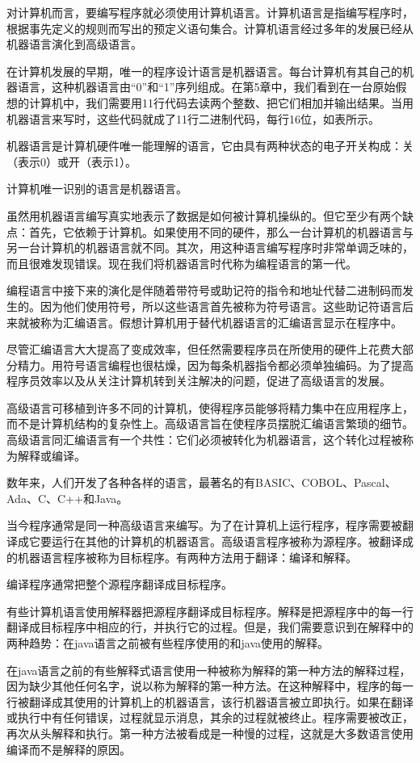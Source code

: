 
对计算机而言，要编写程序就必须使用计算机语言。计算机语言是指编写程序时，根据事先定义的规则而写出的预定义语句集合。计算机语言经过多年的发展已经从机器语言演化到高级语言。

在计算机发展的早期，唯一的程序设计语言是机器语言。每台计算机有其自己的机器语言，这种机器语言由“0”和“1”序列组成。在第5章中，我们看到在一台原始假想的计算机中，我们需要用11行代码去读两个整数、把它们相加并输出结果。当用机器语言来写时，这些代码就成了11行二进制代码，每行16位，如表所示。

机器语言是计算机硬件唯一能理解的语言，它由具有两种状态的电子开关构成：关（表示0）或开（表示1）。

计算机唯一识别的语言是机器语言。

虽然用机器语言编写真实地表示了数据是如何被计算机操纵的。但它至少有两个缺点：首先，它依赖于计算机。如果使用不同的硬件，那么一台计算机的机器语言与另一台计算机的机器语言就不同。其次，用这种语言编写程序时非常单调乏味的，而且很难发现错误。现在我们将机器语言时代称为编程语言的第一代。

编程语言中接下来的演化是伴随着带符号或助记符的指令和地址代替二进制码而发生的。因为他们使用符号，所以这些语言首先被称为符号语言。这些助记符语言后来就被称为汇编语言。假想计算机用于替代机器语言的汇编语言显示在程序中。

尽管汇编语言大大提高了变成效率，但任然需要程序员在所使用的硬件上花费大部分精力。用符号语言编程也很枯燥，因为每条机器指令都必须单独编码。为了提高程序员效率以及从关注计算机转到关注解决的问题，促进了高级语言的发展。

高级语言可移植到许多不同的计算机，使得程序员能够将精力集中在应用程序上，而不是计算机结构的复杂性上。高级语言旨在使程序员摆脱汇编语言繁琐的细节。高级语言同汇编语言有一个共性：它们必须被转化为机器语言，这个转化过程被称为解释或编译。

数年来，人们开发了各种各样的语言，最著名的有BASIC、COBOL、Pascal、Ada、C、C++和Java。

当今程序通常是同一种高级语言来编写。为了在计算机上运行程序，程序需要被翻译成它要运行在其他的计算机的机器语言。高级语言程序被称为源程序。被翻译成的机器语言程序被称为目标程序。有两种方法用于翻译：编译和解释。

编译程序通常把整个源程序翻译成目标程序。

有些计算机语言使用解释器把源程序翻译成目标程序。解释是把源程序中的每一行翻译成目标程序中相应的行，并执行它的过程。但是，我们需要意识到在解释中的两种趋势：在java语言之前被有些程序使用的和java使用的解释。

在java语言之前的有些解释式语言使用一种被称为解释的第一种方法的解释过程，因为缺少其他任何名字，说以称为解释的第一种方法。在这种解释中，程序的每一行被翻译成其使用的计算机上的机器语言，该行机器语言被立即执行。如果在翻译或执行中有任何错误，过程就显示消息，其余的过程就被终止。程序需要被改正，再次从头解释和执行。第一种方法被看成是一种慢的过程，这就是大多数语言使用编译而不是解释的原因。

